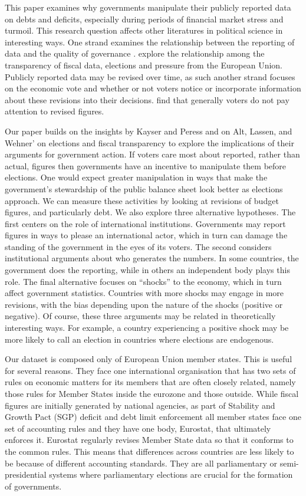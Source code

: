 \documentclass[]{article}
\begin{document}
This paper examines why governments manipulate their publicly reported data on debts and deficits, especially during periods of financial market stress and turmoil. This research question affects other literatures in political science in interesting ways. One strand examines the relationship between the reporting of data and the quality of governance \cite[e.g.]{Hollyer2014}. \cite{Alt2014} explore the relationship among the transparency of fiscal data, elections and pressure from the European Union. Publicly reported data may be revised over time, as such another strand focuses on the economic vote and whether or not voters notice or incorporate information about these revisions into their decisions. \cite{kayser_peress} find that generally voters do not pay attention to revised figures.

Our paper builds on the insights by Kayser and Peress and on Alt, Lassen, and Wehner’ on elections and fiscal transparency to explore the implications of their arguments for government action. If voters care most about reported, rather than actual, figures then governments have an incentive to manipulate them before elections. One would expect greater manipulation in ways that make the government's stewardship of the public balance sheet look better as elections approach. We can measure these activities by looking at revisions of budget figures, and particularly debt. We also explore three alternative hypotheses. The first centers on the role of international institutions. Governments may report figures in ways to please an international actor, which in turn can damage the standing of the government in the eyes of its voters. The second considers institutional arguments about who generates the numbers. In some countries, the government does the reporting, while in others an independent body plays this role. The final alternative focuses on ``shocks'' to the economy, which in turn affect government statistics. Countries with more shocks may engage in more revisions, with the bias depending upon the nature of the shocks (positive or negative). Of course, these three arguments may be related in theoretically interesting ways. For example, a country experiencing a positive shock may be more likely to call an election in countries where elections are endogenous.

Our dataset is composed only of European Union member states. This is useful for several reasons. They face one international organisation that has two sets of rules on economic matters for its members that are often closely related, namely those rules for Member States inside the eurozone and those outside. While fiscal figures are initially generated by national agencies, as part of Stability and Growth Pact (SGP) deficit and debt limit enforcement all member states face one set of accounting rules and they have one body, Eurostat, that ultimately enforces it. Eurostat regularly revises Member State data so that it conforms to the common rules. This means that differences across countries are less likely to be because of different accounting standards. They are all parliamentary or semi-presidential systems where parliamentary elections are crucial for the formation of governments.
\end{document}
